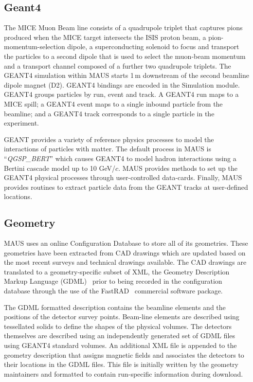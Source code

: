 \documentclass{JINST}
\begin{document}
\subsection{Geant4}\label{sec:geant}
The MICE Muon Beam line consists of a quadrupole triplet that captures pions produced when the MICE target intersects the ISIS proton beam, a pion-momentum-selection dipole, a superconducting solenoid to focus and transport the particles to a second dipole that is used to select the muon-beam momentum and a transport channel composed of a further two quadrupole triplets. The GEANT4 simulation within MAUS starts 1\,m downstream of the second beamline dipole magnet (D2). GEANT4 bindings are encoded in the Simulation module. GEANT4 groups particles by run, event and track. A GEANT4 run maps to a MICE spill; a GEANT4 event maps to a single inbound particle from the beamline; and a GEANT4 track corresponds to a single particle in the experiment.

GEANT provides a variety of reference physics processes to model the interactions of particles with matter. The default process in MAUS is ``\emph{QGSP\_BERT}'' which causes GEANT4 to model hadron interactions using a Bertini cascade model up to 10 GeV/$c$. MAUS provides methods to set up the GEANT4 physical processes through user-controlled data-cards. Finally, MAUS provides routines to extract particle data from the GEANT tracks at user-defined locations.

\subsection{Geometry}\label{sec:geo}

MAUS uses an online Configuration Database to store all of its
geometries. These geometries have been extracted from CAD drawings
which are  updated based on the most recent surveys and technical drawings
available. The CAD drawings are translated to a geometry-specific
subset of XML, the Geometry Description Markup Language (GDML)~\cite{GDML} prior
to being recorded in the configuration database through the use of the 
FastRAD~\cite{fastrad} commercial software package. 

The GDML formatted description contains the beamline elements and the positions of
the detector survey points. Beam-line elements are described using 
tessellated solids to define the shapes of the physical
volumes. The detectors themselves are described using an independently
generated set of GDML files using GEANT4 standard volumes. An
additional XML file is appended to the geometry description that
assigns magnetic fields and associates the detectors to their
locations in the GDML files. This file is
initially written by the geometry maintainers and formatted to contain
run-specific information during download.
\end{document}
